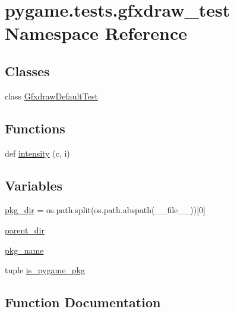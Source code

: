 \hypertarget{namespacepygame_1_1tests_1_1gfxdraw__test}{}\section{pygame.\+tests.\+gfxdraw\+\_\+test Namespace Reference}
\label{namespacepygame_1_1tests_1_1gfxdraw__test}
\subsection*{Classes}
\begin{DoxyCompactItemize}
\item 
class \hyperlink{classpygame_1_1tests_1_1gfxdraw__test_1_1_gfxdraw_default_test}{Gfxdraw\+Default\+Test}
\end{DoxyCompactItemize}
\subsection*{Functions}
\begin{DoxyCompactItemize}
\item 
def \hyperlink{namespacepygame_1_1tests_1_1gfxdraw__test_aeb5497b1398ca7e605df31b554d685dc}{intensity} (c, i)
\end{DoxyCompactItemize}
\subsection*{Variables}
\begin{DoxyCompactItemize}
\item 
\hyperlink{namespacepygame_1_1tests_1_1gfxdraw__test_a464ca28b51990fce8bce0a4394516186}{pkg\+\_\+dir} = os.\+path.\+split(os.\+path.\+abspath(\+\_\+\+\_\+file\+\_\+\+\_\+))\mbox{[}0\mbox{]}
\item 
\hyperlink{namespacepygame_1_1tests_1_1gfxdraw__test_a8c9abdd83556b23287f0563c4f317852}{parent\+\_\+dir}
\item 
\hyperlink{namespacepygame_1_1tests_1_1gfxdraw__test_afc291acae8014ccb74f0b22f9dc10f9f}{pkg\+\_\+name}
\item 
tuple \hyperlink{namespacepygame_1_1tests_1_1gfxdraw__test_a1d2ee28cc0000ecbee13df6f51a100f4}{is\+\_\+pygame\+\_\+pkg}
\end{DoxyCompactItemize}


\subsection{Function Documentation}
\mbox{\label{namespacepygame_1_1tests_1_1gfxdraw__test_aeb5497b1398ca7e605df31b554d685dc}} 
